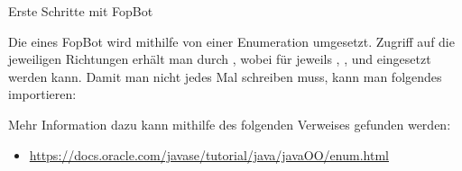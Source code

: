 \documentclass{../tuda-exercise}
\begin{document}
\begin{task}[credit=\stars{1}{3}]{Erste Schritte mit FopBot}
    \clearpagesolution

    \begin{solution}
      

      \begin{note}[title=Information:]
        Die  eines FopBot wird mithilfe von einer Enumeration umgesetzt.
        Zugriff auf die jeweiligen Richtungen erhält man durch , wobei
        für  jeweils , ,  und
         eingesetzt werden kann. Damit man nicht jedes Mal
         schreiben muss, kann man folgendes importieren:

        \begin{center}
        \end{center}

        Mehr Information dazu kann mithilfe des folgenden Verweises gefunden werden:

        \begin{itemize}
          \item \url{https://docs.oracle.com/javase/tutorial/java/javaOO/enum.html}
        \end{itemize}
      \end{note}
    \end{solution}
  \end{task}

  \clearpage
\end{document}
